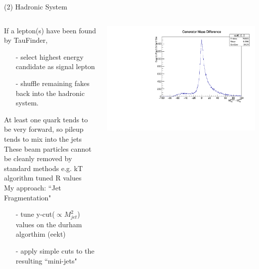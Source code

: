 \documentclass[10pt]{beamer}
\begin{document}
\begin{frame}{(2) Hadronic System}

\begin{columns}
\begin{column}{0.5\textwidth}
If a lepton(s) have been found by TauFinder, 
\begin{itemize}
\scriptsize
\item[-]select highest energy candidate as signal lepton\\
\item[-] shuffle remaining fakes back into the hadronic system.\\
\end{itemize}
\scriptsize
At least one quark tends to be very forward, so pileup tends to mix into the jets\\
These beam particles cannot be cleanly removed by standard methods e.g. kT algorithm tuned R values\\
\normalsize
My approach: ``Jet Fragmentation"\\
  \begin{itemize}
  	\scriptsize
  \item[-]tune y-cut($\propto M^2_{jet}$) values on the durham algorthim (eekt)
  \item[-]apply simple cuts to the resulting ``mini-jets"\\
  \end{itemize}
\end{column}
\begin{column}{0.5\textwidth}
\includegraphics[scale=0.3]{nocutDiff.pdf}
\end{column}
\end{columns}


\end{frame}
\end{document}
